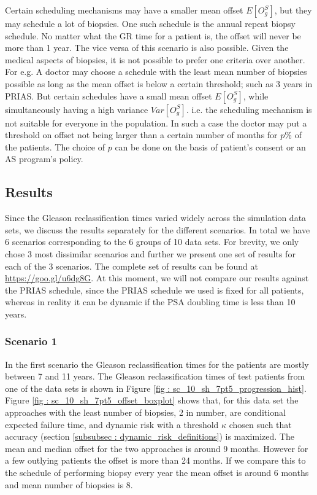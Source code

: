 Certain scheduling mechanisms may have a smaller mean offset $E[O^S_g]$, but they may schedule a lot of biopsies. One such schedule is the annual repeat biopsy schedule. No matter what the GR time for a patient is, the offset will never be more than 1 year. The vice versa of this scenario is also possible. Given the medical aspects of biopsies, it is not possible to prefer one criteria over another. For e.g. A doctor may choose a schedule with the least mean number of biopsies possible as long as the mean offset is below a certain threshold; such as 3 years in PRIAS. But certain schedules have a small mean offset $E[O^S_g]$, while simultaneously having a high variance $Var[O^S_g]$. i.e. the scheduling mechanism is not suitable for everyone in the population. In such a case the doctor may put a threshold on offset not being larger than a certain number of months for $p$\% of the patients. The choice of $p$ can be done on the basis of patient's consent or an AS program's policy.

\subsection{Results}
Since the Gleason reclassification times varied widely across the simulation data sets, we discuss the results separately for the different scenarios. In total we have 6 scenarios corresponding to the 6 groups of 10 data sets. For brevity, we only chose 3 most dissimilar scenarios and further we present one set of results for each of the 3 scenarios. The complete set of results can be found at \url{https://goo.gl/u6dg8G}. At this moment, we will not compare our results against the PRIAS schedule, since the PRIAS schedule we used is fixed for all patients, whereas in reality it can be dynamic if the PSA doubling time is less than 10 years.

\subsubsection{Scenario 1}
In the first scenario the Gleason reclassification times for the patients are mostly between 7 and 11 years. The Gleason reclassification times of test patients from one of the data sets is shown in Figure \ref{fig : sc_10_sh_7pt5_progression_hist}. Figure \ref{fig : sc_10_sh_7pt5_offset_boxplot} shows that, for this data set the approaches with the least number of biopsies, 2 in number, are conditional expected failure time, and dynamic risk with a threshold $\kappa$ chosen such that accuracy (section \ref{subsubsec : dynamic_risk_definitions}) is maximized. The mean and median offset for the two approaches is around 9 months. However for a few outlying patients the offset is more than 24 months. If we compare this to the schedule of performing biopsy every year the mean offset is around 6 months and mean number of biopsies is 8. 

